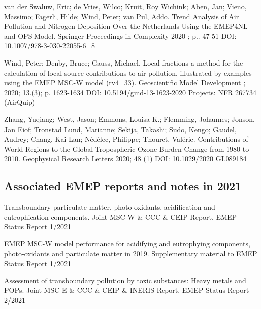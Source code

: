 \begin{list}{}{\setlength{\leftmargin}{15pt}\setlength{\itemindent}{-\leftmargin}}
\item[]
van der Swaluw, Eric; de Vries, Wilco; Kruit, Roy Wichink; Aben, Jan; Vieno, Massimo; Fagerli, Hilde; Wind, Peter; van Pul, Addo.
Trend Analysis of Air Pollution and Nitrogen Deposition Over the Netherlands Using the EMEP4NL and OPS Model.
Springer Proceedings in Complexity 2020 ; p.. 47-51
DOI: 10.1007/978-3-030-22055-6\_8 

\item[]
Wind, Peter; Denby, Bruce; Gauss, Michael.
Local fractions-a method for the calculation of local source contributions to air pollution, illustrated by examples using the EMEP MSC-W model (rv4\_33).
Geoscientific Model Development ; 2020; 13.(3); p. 1623-1634
DOI: 10.5194/gmd-13-1623-2020	Projects: NFR 267734 (AirQuip) 

\item[]
Zhang, Yuqiang; West, Jason; Emmons, Louisa K.; Flemming, Johannes; Jonson, Jan Eiof; Tronstad Lund, Marianne; Sekija, Takashi; Sudo, Kengo; Gaudel, Audrey; Chang, Kai-Lan; Nédélec, Philippe; Thouret, Valérie.
Contributions of World Regions to the Global Tropospheric Ozone Burden Change from 1980 to 2010.
Geophysical Research Letters 2020; 48 (1)
DOI: 10.1029/2020 GL089184

\end{list}


\subsection*{Associated EMEP reports and notes in 2021}

\vspace{0.5cm}

\enlargethispage{\baselineskip}
\begin{list}{}{\setlength{\leftmargin}{15pt}\setlength{\itemindent}{-\leftmargin}}\small
\item[]
Transboundary particulate matter, photo-oxidants, acidification and eutrophication components. Joint MSC-W \& CCC \& CEIP Report. EMEP Status Report 1/2021

\item[] EMEP MSC-W model performance for acidifying and
  eutrophying components, photo-oxidants and particulate matter in
  2019. Supplementary material to EMEP Status Report 1/2021

\item[]
 Assessment of transboundary pollution by toxic substances: Heavy metals and POPs.  Joint MSC-E  \& CCC  \& CEIP  \& INERIS Report. EMEP Status Report 2/2021

\end{list}


